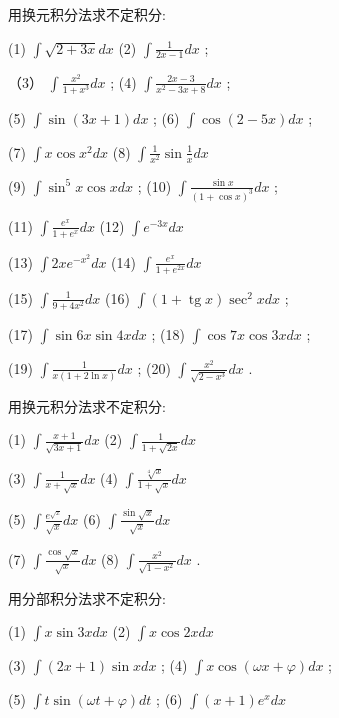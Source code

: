 \documentclass[lang=cn,newtx,12pt,scheme=chinese]{elegantbook}
\begin{document}
\begin{problemset}[习 题 十 四]

\item 用换元积分法求不定积分:

(1) \(\int \sqrt{2 + {3x}}{dx}\) (2) \(\int \frac{1}{{2x} - 1}{dx}\) ;

（3） \(\int \frac{{x}^{2}}{1 + {x}^{3}}{dx}\) ; (4) \(\int \frac{{2x} - 3}{{x}^{2} - {3x} + 8}{dx}\) ;

(5) \(\int \sin \left( {{3x} + 1}\right) {dx}\) ; (6) \(\int \cos \left( {2 - {5x}}\right) {dx}\) ;

(7) \(\int x\cos {x}^{2}{dx}\) (8) \(\int \frac{1}{{x}^{2}}\sin \frac{1}{x}{dx}\)

(9) \(\int {\sin }^{5}x\cos {xdx}\) ; (10) \(\int \frac{\sin x}{{\left( 1 + \cos x\right) }^{3}}{dx}\) ;

(11) \(\int \frac{{e}^{x}}{1 + {e}^{x}}{dx}\) (12) \(\int {e}^{-{3x}}{dx}\)

(13) \(\int {2x}{e}^{-{x}^{2}}{dx}\) (14) \(\int \frac{{e}^{x}}{1 + {e}^{2x}}{dx}\)

(15) \(\int \frac{1}{9 + 4{x}^{2}}{dx}\) (16) \(\int \left( {1 + \operatorname{tg}x}\right) {\sec }^{2}{xdx}\) ;

(17) \(\int \sin {6x}\sin {4xdx}\) ; (18) \(\int \cos {7x}\cos {3xdx}\) ;

(19) \(\int \frac{1}{x\left( {1 + 2\ln x}\right) }{dx}\) ; (20) \(\int \frac{{x}^{2}}{\sqrt{2 - {x}^{3}}}{dx}\) .

\item 用换元积分法求不定积分:

(1) \(\int \frac{x + 1}{\sqrt{{3x} + 1}}{dx}\) (2) \(\int \frac{1}{1 + \sqrt{2x}}{dx}\)

(3) \(\int \frac{1}{x + \sqrt{x}}{dx}\) (4) \(\int \frac{\sqrt[4]{x}}{1 + \sqrt{x}}{dx}\)

(5) \(\int \frac{{e}^{\sqrt{x}}}{\sqrt{x}}{dx}\) (6) \(\int \frac{\sin \sqrt{x}}{\sqrt{x}}{dx}\)

(7) \(\int \frac{\cos \sqrt{x}}{\sqrt{x}}{dx}\) (8) \(\int \frac{{x}^{2}}{\sqrt{1 - {x}^{2}}}{dx}\) .

\item 用分部积分法求不定积分:

(1) \(\int x\sin {3xdx}\) (2) \(\int x\cos {2xdx}\)

(3) \(\int \left( {{2x} + 1}\right) \sin {xdx}\) ; (4) \(\int x\cos \left( {{\omega x} + \varphi }\right) {dx}\) ;

(5) \(\int t\sin \left( {{\omega t} + \varphi }\right) {dt}\) ; (6) \(\int \left( {x + 1}\right) {e}^{x}{dx}\)


\end{problemset}
\end{document}
